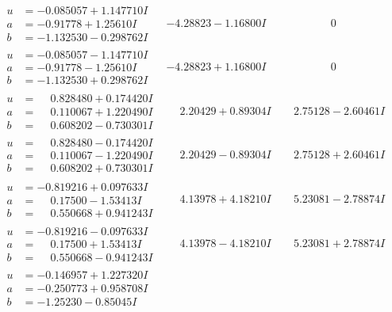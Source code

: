\documentclass[1p]{elsarticle_modified}
\theoremstyle{definition}
\begin{document}
$$\begin{array}{c|c|c}
\begin{aligned}
u &= -0.085057 + 1.147710 I \\
a &= -0.91778 + 1.25610 I \\
b &= -1.132530 - 0.298762 I\end{aligned}
 & -4.28823 - 1.16800 I & \phantom{-0.000000 } 0 \\ \hline\begin{aligned}
u &= -0.085057 - 1.147710 I \\
a &= -0.91778 - 1.25610 I \\
b &= -1.132530 + 0.298762 I\end{aligned}
 & -4.28823 + 1.16800 I & \phantom{-0.000000 } 0 \\ \hline\begin{aligned}
u &= \phantom{-}0.828480 + 0.174420 I \\
a &= \phantom{-}0.110067 + 1.220490 I \\
b &= \phantom{-}0.608202 - 0.730301 I\end{aligned}
 & \phantom{-}2.20429 + 0.89304 I & \phantom{-}2.75128 - 2.60461 I \\ \hline\begin{aligned}
u &= \phantom{-}0.828480 - 0.174420 I \\
a &= \phantom{-}0.110067 - 1.220490 I \\
b &= \phantom{-}0.608202 + 0.730301 I\end{aligned}
 & \phantom{-}2.20429 - 0.89304 I & \phantom{-}2.75128 + 2.60461 I \\ \hline\begin{aligned}
u &= -0.819216 + 0.097633 I \\
a &= \phantom{-}0.17500 - 1.53413 I \\
b &= \phantom{-}0.550668 + 0.941243 I\end{aligned}
 & \phantom{-}4.13978 + 4.18210 I & \phantom{-}5.23081 - 2.78874 I \\ \hline\begin{aligned}
u &= -0.819216 - 0.097633 I \\
a &= \phantom{-}0.17500 + 1.53413 I \\
b &= \phantom{-}0.550668 - 0.941243 I\end{aligned}
 & \phantom{-}4.13978 - 4.18210 I & \phantom{-}5.23081 + 2.78874 I \\ \hline\begin{aligned}
u &= -0.146957 + 1.227320 I \\
a &= -0.250773 + 0.958708 I \\
b &= -1.25230 - 0.85045 I\end{aligned}

\end{array}$$
\end{document}

